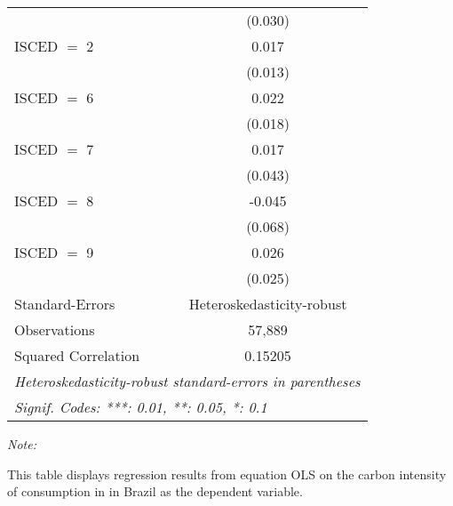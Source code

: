\begin{table}[htbp!]
\begin{adjustbox}{width = 1\textwidth, max height = 0.95\textheight, center}
\begin{threeparttable}[b]
\begin{tabular}{lc}
                                & (0.030)\\   
            ISCED $=$ 2         & 0.017\\   
                                & (0.013)\\   
            ISCED $=$ 6         & 0.022\\   
                                & (0.018)\\   
            ISCED $=$ 7         & 0.017\\   
                                & (0.043)\\   
            ISCED $=$ 8         & -0.045\\   
                                & (0.068)\\   
            ISCED $=$ 9         & 0.026\\   
                                & (0.025)\\   
            \midrule 
            Standard-Errors     & Heteroskedasticity-robust \\   
            Observations        & 57,889\\  
            Squared Correlation & 0.15205\\  
            \midrule \midrule
            \multicolumn{2}{l}{\emph{Heteroskedasticity-robust standard-errors in parentheses}}\\
            \multicolumn{2}{l}{\emph{Signif. Codes: ***: 0.01, **: 0.05, *: 0.1}}\\
         \end{tabular}
         
         \begin{tablenotes}\item \medskip \textit{Note:}
            \item This table displays regression results from equation OLS on the carbon intensity of consumption in  in Brazil as the dependent variable. 
         \end{tablenotes}
      \end{threeparttable}
   \end{adjustbox}
\end{table}


